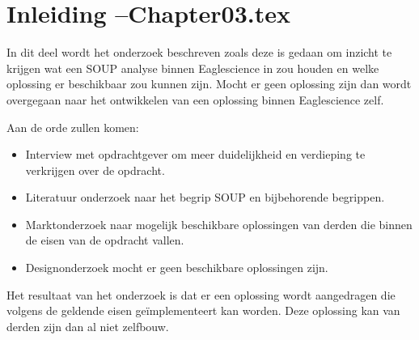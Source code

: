 
\chapter{Inleiding --Chapter03.tex} %

\label{inOnderzoek} %

In dit deel wordt het onderzoek beschreven zoals deze is gedaan om inzicht te krijgen wat een SOUP analyse binnen Eaglescience in zou houden en welke oplossing er beschikbaar zou kunnen zijn. Mocht er geen oplossing zijn dan wordt overgegaan naar het ontwikkelen van een oplossing binnen Eaglescience zelf.

Aan de orde zullen komen:
\begin{itemize}
\item Interview met opdrachtgever om meer duidelijkheid en verdieping te verkrijgen over de opdracht.
\item Literatuur onderzoek naar het begrip SOUP en bijbehorende begrippen.
\item Marktonderzoek naar mogelijk beschikbare oplossingen van derden die binnen de eisen van de opdracht vallen.
\item Designonderzoek mocht er geen beschikbare oplossingen zijn.
\end{itemize}

Het resultaat van het onderzoek is dat er een oplossing wordt aangedragen die volgens de geldende eisen ge\"implementeert kan worden. Deze oplossing kan van derden zijn dan al niet zelfbouw. 






